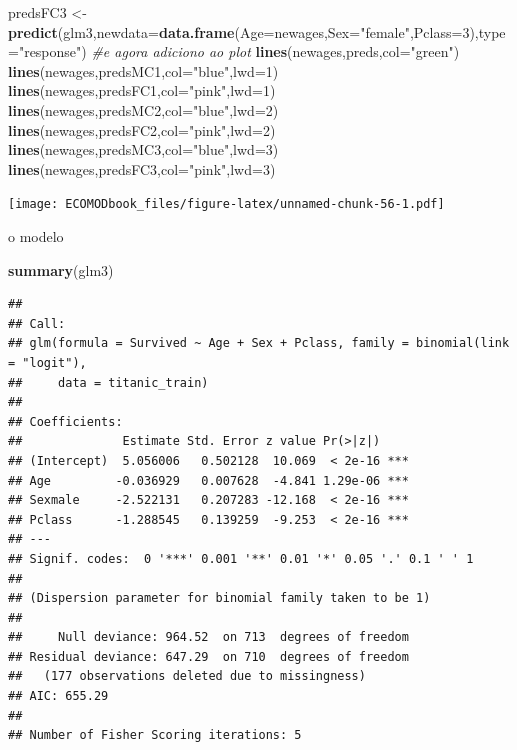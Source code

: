 \documentclass[
]{book}
\newenvironment{Shaded}{\begin{snugshade}}{\end{snugshade}}
\newcommand{\AttributeTok}[1]{\textcolor[rgb]{0.13,0.29,0.53}{#1}}
\newcommand{\CommentTok}[1]{\textcolor[rgb]{0.56,0.35,0.01}{\textit{#1}}}
\newcommand{\DecValTok}[1]{\textcolor[rgb]{0.00,0.00,0.81}{#1}}
\newcommand{\FunctionTok}[1]{\textcolor[rgb]{0.13,0.29,0.53}{\textbf{#1}}}
\newcommand{\NormalTok}[1]{#1}
\newcommand{\OtherTok}[1]{\textcolor[rgb]{0.56,0.35,0.01}{#1}}
\newcommand{\StringTok}[1]{\textcolor[rgb]{0.31,0.60,0.02}{#1}}
\begin{document}
\begin{Shaded}
\begin{Highlighting}[]
\NormalTok{predsFC3 }\OtherTok{\textless{}{-}} \FunctionTok{predict}\NormalTok{(glm3,}\AttributeTok{newdata=}\FunctionTok{data.frame}\NormalTok{(}\AttributeTok{Age=}\NormalTok{newages,}\AttributeTok{Sex=}\StringTok{"female"}\NormalTok{,}\AttributeTok{Pclass=}\DecValTok{3}\NormalTok{),}\AttributeTok{type=}\StringTok{"response"}\NormalTok{)}
\CommentTok{\#e agora adiciono ao plot}
\FunctionTok{lines}\NormalTok{(newages,preds,}\AttributeTok{col=}\StringTok{"green"}\NormalTok{)}
\FunctionTok{lines}\NormalTok{(newages,predsMC1,}\AttributeTok{col=}\StringTok{"blue"}\NormalTok{,}\AttributeTok{lwd=}\DecValTok{1}\NormalTok{)}
\FunctionTok{lines}\NormalTok{(newages,predsFC1,}\AttributeTok{col=}\StringTok{"pink"}\NormalTok{,}\AttributeTok{lwd=}\DecValTok{1}\NormalTok{)}
\FunctionTok{lines}\NormalTok{(newages,predsMC2,}\AttributeTok{col=}\StringTok{"blue"}\NormalTok{,}\AttributeTok{lwd=}\DecValTok{2}\NormalTok{)}
\FunctionTok{lines}\NormalTok{(newages,predsFC2,}\AttributeTok{col=}\StringTok{"pink"}\NormalTok{,}\AttributeTok{lwd=}\DecValTok{2}\NormalTok{)}
\FunctionTok{lines}\NormalTok{(newages,predsMC3,}\AttributeTok{col=}\StringTok{"blue"}\NormalTok{,}\AttributeTok{lwd=}\DecValTok{3}\NormalTok{)}
\FunctionTok{lines}\NormalTok{(newages,predsFC3,}\AttributeTok{col=}\StringTok{"pink"}\NormalTok{,}\AttributeTok{lwd=}\DecValTok{3}\NormalTok{)}
\end{Highlighting}
\end{Shaded}

\texttt{[image: ECOMODbook\_files/figure-latex/unnamed-chunk-56-1.pdf]}

o modelo

\begin{Shaded}
\begin{Highlighting}[]
\FunctionTok{summary}\NormalTok{(glm3)}
\end{Highlighting}
\end{Shaded}

\begin{verbatim}
## 
## Call:
## glm(formula = Survived ~ Age + Sex + Pclass, family = binomial(link = "logit"), 
##     data = titanic_train)
## 
## Coefficients:
##              Estimate Std. Error z value Pr(>|z|)    
## (Intercept)  5.056006   0.502128  10.069  < 2e-16 ***
## Age         -0.036929   0.007628  -4.841 1.29e-06 ***
## Sexmale     -2.522131   0.207283 -12.168  < 2e-16 ***
## Pclass      -1.288545   0.139259  -9.253  < 2e-16 ***
## ---
## Signif. codes:  0 '***' 0.001 '**' 0.01 '*' 0.05 '.' 0.1 ' ' 1
## 
## (Dispersion parameter for binomial family taken to be 1)
## 
##     Null deviance: 964.52  on 713  degrees of freedom
## Residual deviance: 647.29  on 710  degrees of freedom
##   (177 observations deleted due to missingness)
## AIC: 655.29
## 
## Number of Fisher Scoring iterations: 5
\end{verbatim}
\end{document}
